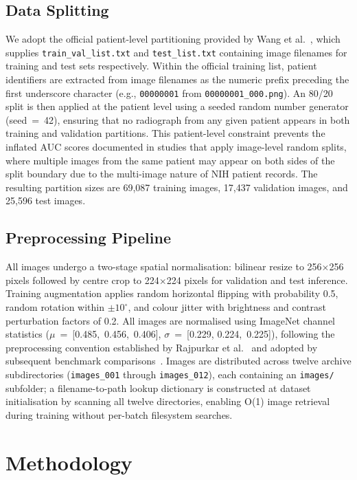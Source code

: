 \documentclass[conference]{IEEEtran}
\begin{document}
\subsection{Data Splitting}

We adopt the official patient-level partitioning provided by Wang
et al.~\cite{wang2017}, which supplies \texttt{train\_val\_list.txt}
and \texttt{test\_list.txt} containing image filenames for training
and test sets respectively. Within the official training list, patient
identifiers are extracted from image filenames as the numeric prefix
preceding the first underscore character (e.g., \texttt{00000001}
from \texttt{00000001\_000.png}). An 80/20 split is then applied at
the patient level using a seeded random number generator (seed~=~42),
ensuring that no radiograph from any given patient appears in both
training and validation partitions. This patient-level constraint
prevents the inflated AUC scores documented in studies that apply
image-level random splits, where multiple images from the same patient
may appear on both sides of the split boundary due to the multi-image
nature of NIH patient records. The resulting partition sizes are 69,087
training images, 17,437 validation images, and 25,596 test images.

\subsection{Preprocessing Pipeline}

All images undergo a two-stage spatial normalisation: bilinear resize
to 256$\times$256 pixels followed by centre crop to 224$\times$224
pixels for validation and test inference. Training augmentation applies
random horizontal flipping with probability 0.5, random rotation within
$\pm10^\circ$, and colour jitter with brightness and contrast
perturbation factors of 0.2. All images are normalised using ImageNet
channel statistics ($\mu$~=~[0.485,~0.456,~0.406], $\sigma$~=~[0.229,
0.224,~0.225]), following the preprocessing convention established by
Rajpurkar et al.~\cite{rajpurkar2017} and adopted by subsequent
benchmark comparisons~\cite{baltruschat2019}. Images are distributed
across twelve archive subdirectories (\texttt{images\_001} through
\texttt{images\_012}), each containing an \texttt{images/} subfolder;
a filename-to-path lookup dictionary is constructed at dataset
initialisation by scanning all twelve directories, enabling O(1)
image retrieval during training without per-batch filesystem searches.

\section{Methodology}
\end{document}
